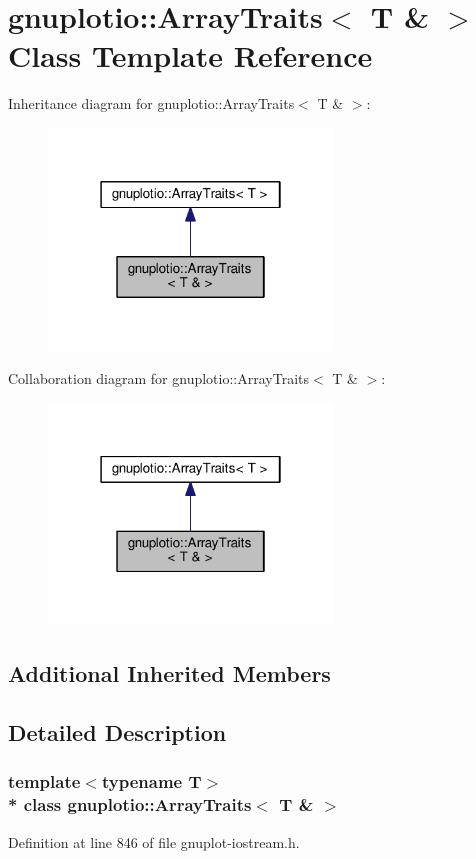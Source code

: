 \hypertarget{classgnuplotio_1_1_array_traits_3_01_t_01_6_01_4}{}\section{gnuplotio\+:\+:Array\+Traits$<$ T \& $>$ Class Template Reference}
\label{classgnuplotio_1_1_array_traits_3_01_t_01_6_01_4}


Inheritance diagram for gnuplotio\+:\+:Array\+Traits$<$ T \& $>$\+:\nopagebreak
\begin{figure}[H]
\begin{center}
\leavevmode
\includegraphics[width=214pt]{classgnuplotio_1_1_array_traits_3_01_t_01_6_01_4__inherit__graph}
\end{center}
\end{figure}


Collaboration diagram for gnuplotio\+:\+:Array\+Traits$<$ T \& $>$\+:\nopagebreak
\begin{figure}[H]
\begin{center}
\leavevmode
\includegraphics[width=214pt]{classgnuplotio_1_1_array_traits_3_01_t_01_6_01_4__coll__graph}
\end{center}
\end{figure}
\subsection*{Additional Inherited Members}


\subsection{Detailed Description}
\subsubsection*{template$<$typename T$>$\\*
class gnuplotio\+::\+Array\+Traits$<$ T \& $>$}



Definition at line 846 of file gnuplot-\/iostream.\+h.

